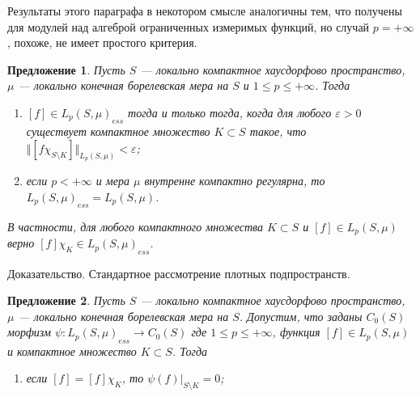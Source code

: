 \documentclass[12pt]{article}
\numberwithin{equation}{subsection}
\theoremstyle{plain}
\newtheorem{proposition}{Предложение}
\newenvironment{proof}{Доказательство.}{}
\begin{document}
\begin{fulltext}
    Результаты этого параграфа в некотором смысле аналогичны тем, что получены
    для модулей над алгеброй ограниченных измеримых функций, но случай
    $p=+\infty$, похоже, не имеет простого критерия.

    \begin{proposition}\label{LpEssC0ModCharac} Пусть $S$ --- локально
        компактное хаусдорфово пространст\-во, $\mu$ --- локально конечная
        борелевская мера на $S$ и $1\leq p\leq+\infty$. Тогда

        \begin{enumerate}[label = (\roman*)]
            \item $[f]\in {L_p(S,\mu)}_{ess}$ тогда и только тогда, когда для
                  любого $\varepsilon >0$ существует компактное множество
                  $K\subset S$ такое, что $\Vert [f\chi_{S\setminus
                              K}]\Vert_{L_p(S,\mu)}< \varepsilon$;

            \item если $p<+\infty$ и мера $\mu$ внутренне компактно регулярна,
                  то ${L_p(S,\mu)}_{ess}=L_p(S,\mu)$.
        \end{enumerate}

        В частности, для любого компактного множества $K\subset S$ и $[f]\in
            L_p(S,\mu)$ верно $[f]\chi_K\in {L_p(S,\mu)}_{ess}$.
    \end{proposition}
    \begin{proof} Стандартное рассмотрение плотных подпространств.
    \end{proof}

    \begin{proposition}\label{MorphLpEssC0Prop} Пусть $S$ --- локально
        компактное хаусдорфово пространст\-во, $\mu$ --- локально конечная
        борелевская мера на $S$. Допустим, что заданы $C_0(S)$\-морфизм
        $\psi:{L_p(S,\mu)}_{ess}\to C_0(S)$ где $1\leq p\leq+\infty$, функция
        $[f]\in L_p(S,\mu)$ и компактное множество $K\subset S$. Тогда

        \begin{enumerate}[label = (\roman*)]
            \item если $[f]=[f]\chi_K$, то $\psi(f)|_{S\setminus K}=0$;


\end{enumerate}
\end{proposition}
\end{fulltext}
\end{document}

